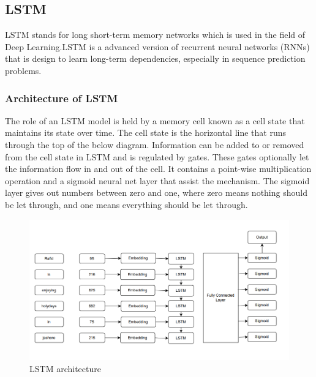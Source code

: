 \subsection{LSTM}
LSTM stands for long short-term memory networks which is used in the field of Deep Learning.LSTM is a advanced version of recurrent neural networks (RNNs) that is design to learn long-term dependencies, especially in sequence prediction problems.

\subsubsection{Architecture of LSTM}
The role of an LSTM model is held by a memory cell known as
a cell state that maintains its state over time. The cell state is the horizontal line that runs through the top of the below diagram. Information can be added to or removed from the cell state in LSTM and is regulated by gates. These gates optionally let the information flow in and out of the cell. It contains a point-wise multiplication operation and a sigmoid neural net layer that assist the mechanism. The sigmoid layer gives out numbers between zero and one, where
zero means nothing should be let through, and one means everything should be let through.


\begin{figure}[h!]
  \includegraphics[width=\linewidth]{chapters/LSTM.png}
  \caption{LSTM architecture}
\end{figure}

